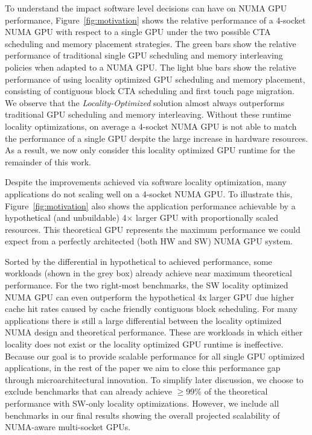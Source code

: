 To understand the impact software level decisions can have on NUMA GPU
performance, Figure~\ref{fig:motivation} shows the relative performance of a 4-socket NUMA 
GPU with respect to a single GPU under the two possible CTA scheduling and 
memory placement strategies.  The green bars show the 
relative performance of traditional single GPU scheduling and memory 
interleaving policies when adapted to a NUMA GPU. The light blue bars
show the relative performance of using locality optimized GPU scheduling and 
memory placement, consisting of contiguous block CTA scheduling and first touch 
page migration. We observe that the \textit{Locality-Optimized} 
solution almost always outperforms traditional GPU scheduling and memory 
interleaving. Without these runtime locality optimizations, on average a 4-socket NUMA 
GPU is not able to match the performance of a single GPU despite the large 
increase in hardware resources. As a result, we now only consider this locality 
optimized GPU runtime for the remainder of this work.

Despite the improvements achieved via software locality optimization, many applications do 
not scaling well on a 4-socket NUMA GPU. To illustrate this, Figure~\ref{fig:motivation} 
also shows the application performance achievable by a hypothetical (and unbuildable)
4$\times$ larger GPU with proportionally scaled resources. This theoretical GPU
represents the maximum performance we could expect from a perfectly architected 
(both HW and SW) NUMA GPU system. 

Sorted by the differential in hypothetical to achieved performance, some 
workloads (shown in the grey box) already achieve near
maximum theoretical performance. For the two right-most 
benchmarks, the SW locality optimized NUMA GPU can even outperform the 
hypothetical 4x larger GPU due higher cache hit rates caused by cache friendly
contiguous block scheduling. For many applications there is still a large differential between the 
locality optimized NUMA design and theoretical performance. These are workloads 
in which either locality does not exist or the locality optimized GPU runtime is 
ineffective. Because our goal is to provide scalable performance for all single GPU 
optimized applications, in the rest of the paper we aim to close this 
performance gap through microarchitectural innovation. To simplify later 
discussion, we choose to exclude benchmarks that can already achieve $\geq$99\% of the 
theoretical performance with SW-only locality optimizations. However, we include 
all benchmarks in our final results showing the overall projected scalability 
of NUMA-aware multi-socket GPUs.
\vspace{-.05in}
